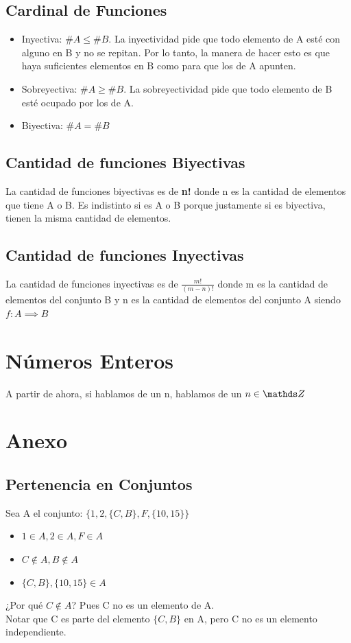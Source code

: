 \documentclass[10pt,a4paper]{article}
\begin{document}
\subsection*{Cardinal de Funciones}
\begin{itemize}
    \item Inyectiva: $\#A \le \#B$. La inyectividad pide que todo elemento de A esté con alguno en B y no se repitan. Por lo tanto, la manera de hacer esto es que haya suficientes elementos en B como para que los de A apunten.
    \item Sobreyectiva: $\#A \ge \#B$. La sobreyectividad pide que todo elemento de B esté ocupado por los de A.
    \item Biyectiva: $\#A = \#B$
\end{itemize}
\subsection*{Cantidad de funciones Biyectivas} 
La cantidad de funciones biyectivas es de \textbf{n!} donde n es la cantidad de elementos que tiene A o B. Es indistinto si es A o B porque justamente si es biyectiva, tienen la misma cantidad de elementos.
\subsection*{Cantidad de funciones Inyectivas}
La cantidad de funciones inyectivas es de \textbf{$\frac{m!}{(m-n)!}$} donde m es la cantidad de elementos del conjunto B y n es la cantidad de elementos del conjunto A siendo $f:A\implies B$
\section*{Números Enteros}
A partir de ahora, si hablamos de un n, hablamos de un $ n \in \ent$
\section*{Anexo}
\subsection*{Pertenencia en Conjuntos}
\label{subsec:pertenecencia_conjuntos}
Sea A el conjunto: $\{1, 2, \{C, B\}, F, \{10, 15\}\}$
\begin{itemize}
    \item $ 1 \in A, 2 \in A, F \in A $
    \item $ C \notin A, B \notin A $
    \item $  \{C, B\}, \{10, 15\} \in A $
\end{itemize}
¿Por qué $C \notin A$? Pues C no es un elemento de A.\\ Notar que C es parte del elemento $\{C, B\}$ en A, pero C no es un elemento independiente.
\end{document}
